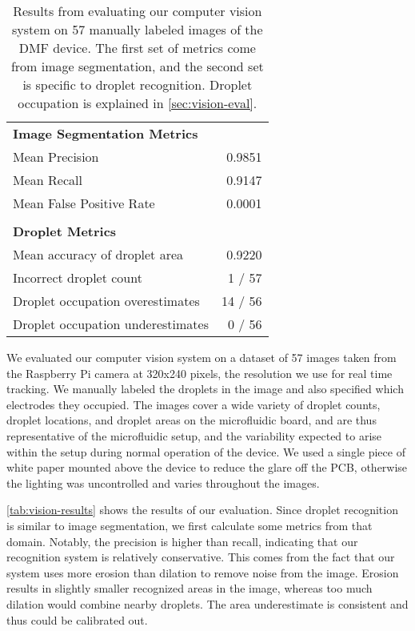 \documentclass[sigplan, screen]{acmart}
\begin{document}
\begin{table}
  \centering
  \begin{tabular}{lr}
    \bf Image Segmentation Metrics \\
    Mean Precision & 0.9851 \\
    Mean Recall & 0.9147 \\
    Mean False Positive Rate & 0.0001 \\
    \\
    \bf Droplet Metrics \\
    Mean accuracy of droplet area & 0.9220  \\
    Incorrect droplet count & 1 / 57 \\
    Droplet occupation overestimates & 14 / 56 \\
    Droplet occupation underestimates & 0 / 56 \\
  \end{tabular}
  \caption{
    Results from evaluating our computer vision system on 57 manually labeled images of the DMF device.
    The first set of metrics come from image segmentation, and the second set is specific to droplet recognition.
    Droplet occupation is explained in \autoref{sec:vision-eval}.
  }
  \label{tab:vision-results}
\end{table}

We evaluated our computer vision system on a dataset of 57 images taken from the Raspberry Pi camera at 320x240 pixels, the resolution we use for real time tracking.
We manually labeled the droplets in the image and also specified which electrodes they occupied.
The images cover a wide variety of droplet counts, droplet locations, and droplet areas on the microfluidic board, and are thus representative of the microfluidic setup, and the variability expected to arise within the setup during normal operation of the device.
We used a single piece of white paper mounted above the device to reduce the glare off the PCB, otherwise the lighting was uncontrolled and varies throughout the images.

\autoref{tab:vision-results} shows the results of our evaluation.
Since droplet recognition is similar to image segmentation, we first calculate some metrics from that domain.
Notably, the precision is higher than recall, indicating that our recognition system is relatively conservative.
This comes from the fact that our system uses more erosion than dilation to remove noise from the image.
Erosion results in slightly smaller recognized areas in the image, whereas too much dilation would combine nearby droplets.
The area underestimate is consistent and thus could be calibrated out.
\end{document}

